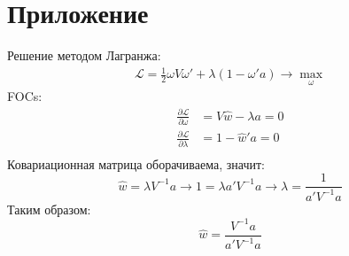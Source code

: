 \documentclass[11pt,a4paper]{article}
\begin{document}
\section*{Приложение}
Решение методом Лагранжа:
\begin{align*}
    \mathcal{L} = \frac{1}{2}\omega V \omega' + \lambda\left(1 - \omega'a  \right) \to\max_{\omega}
\end{align*}
FOCs:
\begin{align*}
    \frac{\partial \mathcal{L}}{\partial \omega}  & = V\hat{w} - \lambda a = 0 \\
    \frac{\partial \mathcal{L}}{\partial \lambda} & = 1 -  \hat{w}'a = 0       \\
\end{align*}
Ковариационная матрица оборачиваема, значит:
\[
    \hat{w} = \lambda V^{-1}a \to 1 = \lambda a' V^{-1}a \to \lambda = \frac{1}{a'V^{-1}a}
\]
Таким образом:
\[
    \hat{w} = \frac{V^{-1}a}{a'V^{-1}a}
\]
\end{document}
